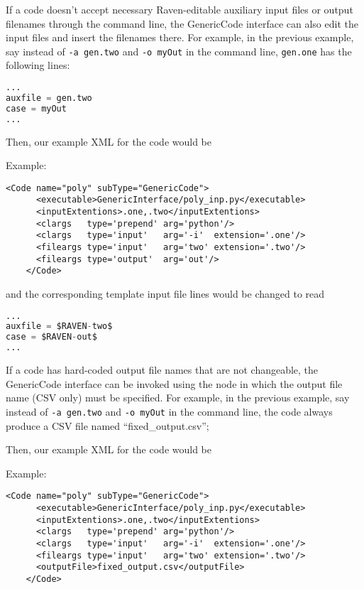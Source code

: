 If a code doesn't accept necessary Raven-editable auxiliary input files
or output filenames through the command line, the GenericCode interface
can also edit the input files and insert the filenames there.  For example,
in the previous example, say instead of \texttt{-a gen.two} and \texttt{-o myOut}
in the command line, \texttt{gen.one} has the following lines:
\begin{lstlisting}[language=python]
...
auxfile = gen.two
case = myOut
...
\end{lstlisting}
Then, our example XML for the code would be

Example:
\begin{lstlisting}[style=XML]
    <Code name="poly" subType="GenericCode">
      <executable>GenericInterface/poly_inp.py</executable>
      <inputExtentions>.one,.two</inputExtentions>
      <clargs   type='prepend' arg='python'/>
      <clargs   type='input'   arg='-i'  extension='.one'/>
      <fileargs type='input'   arg='two' extension='.two'/>
      <fileargs type='output'  arg='out'/>
    </Code>
\end{lstlisting}
and the corresponding template input file lines would be changed to read
\begin{lstlisting}[language=python]
...
auxfile = $RAVEN-two$
case = $RAVEN-out$
...
\end{lstlisting}


If a code has hard-coded output file names that are not changeable,
the GenericCode interface can be invoked using the 
node in which the output file name (CSV only) must be specified.
For example, in the previous example, say instead of \texttt{-a gen.two} and \texttt{-o myOut}
in the command line, the code always produce a CSV file named ``fixed\_output.csv'';

Then, our example XML for the code would be

Example:
\begin{lstlisting}[style=XML]
    <Code name="poly" subType="GenericCode">
      <executable>GenericInterface/poly_inp.py</executable>
      <inputExtentions>.one,.two</inputExtentions>
      <clargs   type='prepend' arg='python'/>
      <clargs   type='input'   arg='-i'  extension='.one'/>
      <fileargs type='input'   arg='two' extension='.two'/>
      <outputFile>fixed_output.csv</outputFile>
    </Code>
\end{lstlisting}

